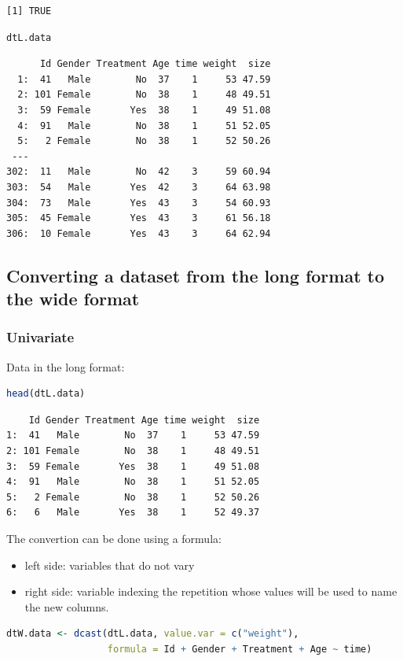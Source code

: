 \documentclass{article}
\begin{document}
\label{}
\begin{verbatim}
[1] TRUE
\end{verbatim}


\begin{lstlisting}[language=r,numbers=none]
dtL.data
\end{lstlisting}

\label{}
\begin{verbatim}
      Id Gender Treatment Age time weight  size
  1:  41   Male        No  37    1     53 47.59
  2: 101 Female        No  38    1     48 49.51
  3:  59 Female       Yes  38    1     49 51.08
  4:  91   Male        No  38    1     51 52.05
  5:   2 Female        No  38    1     52 50.26
 ---                                           
302:  11   Male        No  42    3     59 60.94
303:  54   Male       Yes  42    3     64 63.98
304:  73   Male       Yes  43    3     54 60.93
305:  45 Female       Yes  43    3     61 56.18
306:  10 Female       Yes  43    3     64 62.94
\end{verbatim}
\subsection{Converting a dataset from the long format to the wide format}
\label{sec:orgfc0a393}

\subsubsection{Univariate}
\label{sec:orge59ec40}
Data in the long format:
\begin{lstlisting}[language=r,numbers=none]
head(dtL.data)
\end{lstlisting}

\label{}
\begin{verbatim}
    Id Gender Treatment Age time weight  size
1:  41   Male        No  37    1     53 47.59
2: 101 Female        No  38    1     48 49.51
3:  59 Female       Yes  38    1     49 51.08
4:  91   Male        No  38    1     51 52.05
5:   2 Female        No  38    1     52 50.26
6:   6   Male       Yes  38    1     52 49.37
\end{verbatim}


The convertion can be done using a formula:
\begin{itemize}
\item left side: variables that do not vary
\item right side: variable indexing the repetition whose values will be
used to name the new columns.
\end{itemize}
\begin{lstlisting}[language=r,numbers=none]
dtW.data <- dcast(dtL.data, value.var = c("weight"),
                  formula = Id + Gender + Treatment + Age ~ time)
\end{lstlisting}
\end{document}
